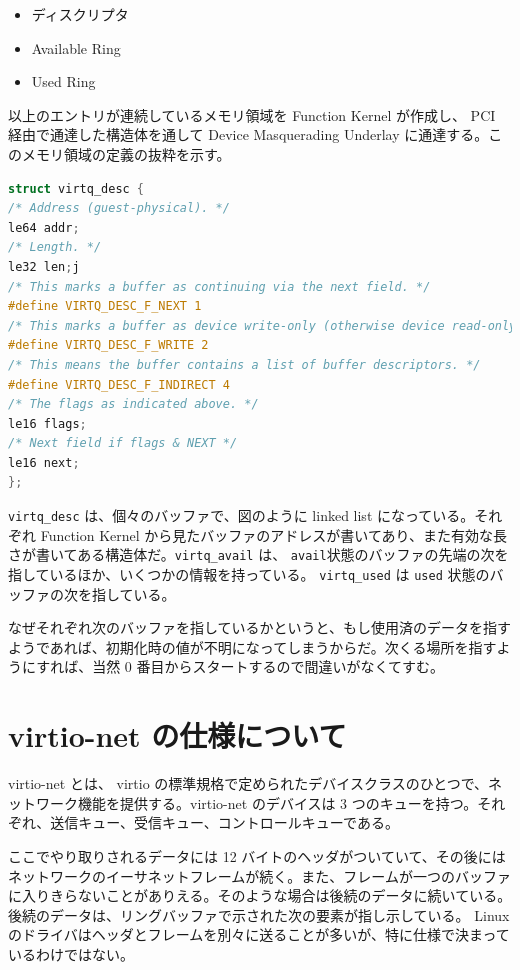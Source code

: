 \documentclass[a4paper,11pt,report]{ltjsbook}
\begin{document}
\begin{itemize}
  \item ディスクリプタ
  \item Available Ring
  \item Used Ring
\end{itemize}

以上のエントリが連続しているメモリ領域を Function Kernel が作成し、 PCI 経由で通達した構造体を通して Device Masquerading Underlay に通達する。このメモリ領域の定義の抜粋を示す。

\begin{lstlisting}[language=C]
struct virtq_desc {
/* Address (guest-physical). */
le64 addr;
/* Length. */
le32 len;j
/* This marks a buffer as continuing via the next field. */
#define VIRTQ_DESC_F_NEXT 1
/* This marks a buffer as device write-only (otherwise device read-only). */
#define VIRTQ_DESC_F_WRITE 2
/* This means the buffer contains a list of buffer descriptors. */
#define VIRTQ_DESC_F_INDIRECT 4
/* The flags as indicated above. */
le16 flags;
/* Next field if flags & NEXT */
le16 next;
};
\end{lstlisting}

\texttt{virtq\_desc} は、個々のバッファで、図のように linked list になっている。それぞれ Function Kernel から見たバッファのアドレスが書いてあり、また有効な長さが書いてある構造体だ。\texttt{virtq\_avail} は、 \texttt{avail}状態のバッファの先端の次を指しているほか、いくつかの情報を持っている。 \texttt{virtq\_used} は \texttt{used} 状態のバッファの次を指している。

なぜそれぞれ次のバッファを指しているかというと、もし使用済のデータを指すようであれば、初期化時の値が不明になってしまうからだ。次くる場所を指すようにすれば、当然 0 番目からスタートするので間違いがなくてすむ。

\section{virtio-net の仕様について}

virtio-net とは、 virtio の標準規格\cite{virtio_spec}で定められたデバイスクラスのひとつで、ネットワーク機能を提供する。virtio-net のデバイスは 3 つのキューを持つ。それぞれ、送信キュー、受信キュー、コントロールキューである。

ここでやり取りされるデータには 12 バイトのヘッダがついていて、その後にはネットワークのイーサネットフレームが続く。また、フレームが一つのバッファに入りきらないことがありえる。そのような場合は後続のデータに続いている。後続のデータは、リングバッファで示された次の要素が指し示している。 Linux のドライバはヘッダとフレームを別々に送ることが多いが、特に仕様で決まっているわけではない。
\end{document}
